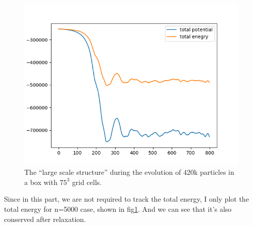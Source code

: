 \documentclass[showpacs, oneside, onecolumn, prl, amsmath, amssymb, nofootinbib, superscriptaddress, notitlepage]{revtex4-1}
\newcommand\bfig{\begin{figure}}
\newcommand\efig{\end{figure}}
\begin{document}
~~~~
\bfig
	\centering
	\includegraphics[scale=0.8]{JH_4_n=5000_energy.png}
	\caption{The ``large scale structure'' during the evolution of 420k particles in a box with $75^3$ grid cells.}
	\label{4-energy}
\efig

Since in this part, we are not required to track the total energy, I only plot the total energy for n=5000 case, shown in fig\ref{4-energy}. And we can see that it's also conserved after relaxation.
\end{document}
